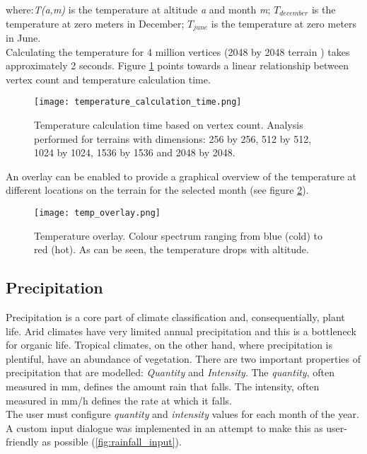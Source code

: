 where:\textit{T(a,m)} is the temperature at altitude \textit{a} and month \textit{m}; \textit{$T_{december}$} is the temperature at zero meters in December; \textit{$T_{june}$} is the temperature at zero meters in June.\\

Calculating the temperature for 4 million vertices (2048 by 2048 terrain ) takes approximately 2 seconds. Figure \ref{fig:temperature_calculation_time} points towards a linear relationship between vertex count and temperature calculation time.

\begin{figure}
\center
	\texttt{[image: temperature\_calculation\_time.png]}
	\caption{ Temperature calculation time based on vertex count. Analysis performed for terrains with dimensions: 256 by 256, 512 by 512, 1024 by 1024, 1536 by 1536 and 2048 by 2048. }
	\label{fig:temperature_calculation_time}
\end{figure}

An overlay can be enabled to provide a graphical overview of the temperature at different locations on the terrain for the selected month (see figure \ref{fig:temp_overlay}).

\begin{figure}
\center
	\texttt{[image: temp\_overlay.png]}
	\caption{ Temperature overlay. Colour spectrum ranging from blue (cold) to red (hot). As can be seen, the temperature drops with altitude.}
	\label{fig:temp_overlay}
\end{figure}

\subsection{Precipitation} \label{sec:precipitation}

Precipitation is a core part of climate classification and, consequentially, plant life. Arid climates have very limited annual precipitation and this is a bottleneck for organic life. Tropical climates, on the other hand, where precipitation is plentiful, have an abundance of vegetation. There are two important properties of precipitation that are modelled: \textit{Quantity} and \textit{Intensity}. The \textit{quantity}, often measured in mm, defines the amount rain that falls. The intensity, often measured in mm/h defines the rate at which it falls.\\

The user must configure \textit{quantity} and \textit{intensity} values for each month of the year. A custom input dialogue was implemented in an attempt to make this as user-friendly as possible (\ref{fig:rainfall_input}).

